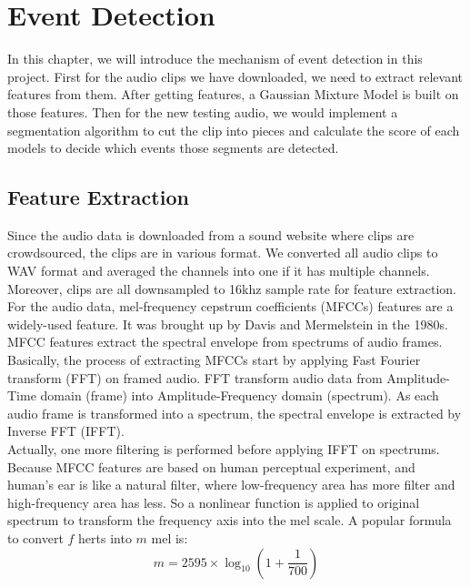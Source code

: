 
\chapter{Event Detection}
In this chapter, we will introduce the mechanism of event detection in this project. 
First for the audio clips we have downloaded, we need to extract relevant features from them. 
After getting features, a Gaussian Mixture Model is built on those features. 
Then for the new testing audio, we would implement a segmentation algorithm to cut the clip into pieces and calculate the score of each models to decide which events those segments are detected.   


\section{Feature Extraction}
Since the audio data is downloaded from a sound website where clips are crowdsourced, the clips are in various format. 
We converted all audio clips to WAV format and averaged the channels into one if it has multiple channels. 
Moreover, clips are all downsampled to 16khz sample rate for feature extraction.\\ 

For the audio data, mel-frequency cepstrum coefficients (MFCCs) features are a widely-used feature. 
It was brought up by Davis and Mermelstein in the 1980s. 
MFCC features extract the spectral envelope from spectrums of audio frames.
Basically, the process of extracting MFCCs start by applying Fast Fourier transform (FFT) on framed audio. 
FFT transform audio data from Amplitude-Time domain (frame) into Amplitude-Frequency domain (spectrum).  
As each audio frame is transformed into a spectrum, the spectral envelope is extracted by Inverse FFT (IFFT).\\ 

Actually, one more filtering is performed before applying IFFT on spectrums. 
Because MFCC features are based on human perceptual experiment, and human's ear is like a natural filter, where low-frequency area has more filter and high-frequency area has less. So a nonlinear function is applied to original spectrum to transform the frequency axis into the mel scale. 
A popular formula to convert $f$ herts into $m$ mel is: \\ 
\begin{equation}
	m = 2595 \times \log_{10}(1+\frac{1}{700})
\end{equation} 

